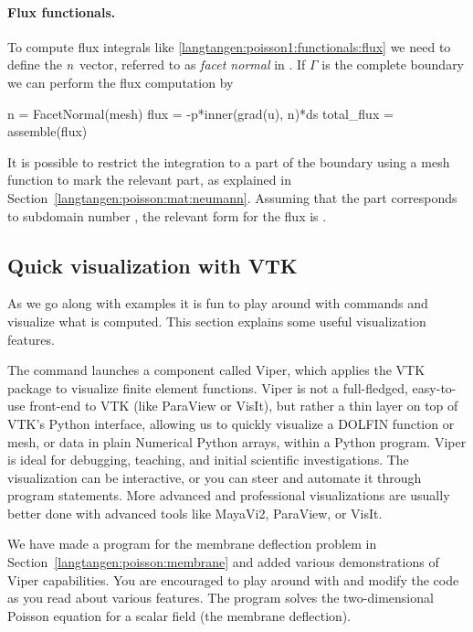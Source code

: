 \paragraph{Flux functionals.}
To compute flux integrals like
\eqref{langtangen:poisson1:functionals:flux} we need to define the
${n}$ vector, referred to as \emph{facet normal} in
\fenics. If $\Gamma$ is the complete boundary we can perform the flux
computation by
\begin{python}
n = FacetNormal(mesh)
flux = -p*inner(grad(u), n)*ds
total_flux = assemble(flux)
\end{python}
It is possible to restrict the integration to a part of the boundary
using a mesh function to mark the relevant part, as explained in
Section~\ref{langtangen:poisson:mat:neumann}. Assuming that the part
corresponds to subdomain number , the
relevant form for the flux is
.

\subsection{Quick visualization with VTK}
\label{langtangen:quickviz}

As we go along with examples it is fun to play around with
 commands and visualize what is
computed. This section explains some useful visualization features.

The  command launches a \fenics{}
component called Viper, which applies the VTK package to visualize
finite element functions.  Viper is not a full-fledged, easy-to-use
front-end to VTK (like ParaView or VisIt), but rather a thin layer on
top of VTK's Python interface, allowing us to quickly visualize a
DOLFIN function or mesh, or data in plain Numerical Python arrays,
within a Python program.  Viper is ideal for debugging, teaching, and
initial scientific investigations.  The visualization can be
interactive, or you can steer and automate it through program
statements.  More advanced and professional visualizations are usually
better done with advanced tools like MayaVi2, ParaView, or VisIt.

We have made a program 
for the membrane deflection problem in
Section~\ref{langtangen:poisson:membrane} and added various
demonstrations of Viper capabilities. You are encouraged to play
around with  and modify
the code as you read about various features.  The
 program solves the
two-dimensional Poisson equation for a scalar field
 (the membrane deflection).

